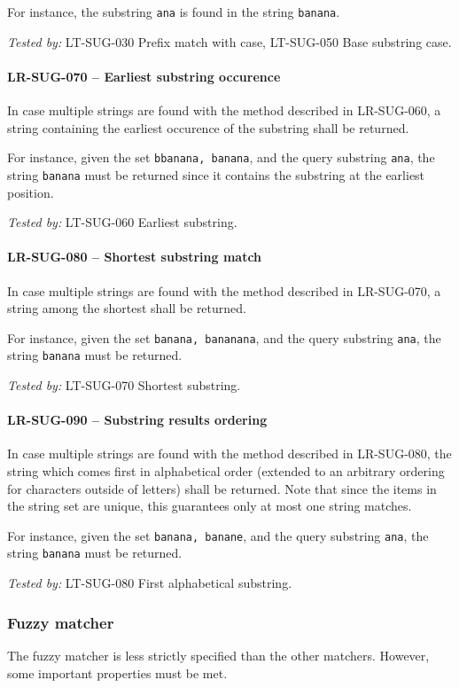 For instance, the substring \lstinline{ana} is found in
the string \lstinline{banana}.

\textit{Tested by: } LT-SUG-030 Prefix match with case,
LT-SUG-050 Base substring case.

\paragraph{LR-SUG-070 -- Earliest substring occurence}
In case multiple strings are found with the method described
in LR-SUG-060, a string containing the earliest occurence
of the substring shall be returned.

For instance, given the set \lstinline{bbanana, banana}, and the
query substring \lstinline{ana}, the string \lstinline{banana}
must be returned since it contains the substring at the earliest
position.

\textit{Tested by: } LT-SUG-060 Earliest substring.

\paragraph{LR-SUG-080 -- Shortest substring match}
In case multiple strings are found with the method described
in LR-SUG-070, a string among the shortest shall be returned.

For instance, given the set \lstinline{banana, bananana}, and
the query substring \lstinline{ana}, the string \lstinline{banana}
must be returned.

\textit{Tested by: } LT-SUG-070 Shortest substring.

\paragraph{LR-SUG-090 -- Substring results ordering}
In case multiple strings are found with the method described
in LR-SUG-080, the string which comes first in alphabetical order
(extended to an arbitrary ordering for characters outside of letters)
shall be returned. Note that since the items in the string set are unique,
this guarantees only at most one string matches.

For instance, given the set \lstinline{banana, banane}, and the query
substring \lstinline{ana}, the string \lstinline{banana} must be
returned.

\textit{Tested by: } LT-SUG-080 First alphabetical substring.

\subsubsection{Fuzzy matcher}
The fuzzy matcher is less strictly specified than the other matchers. However,
some important properties must be met.

